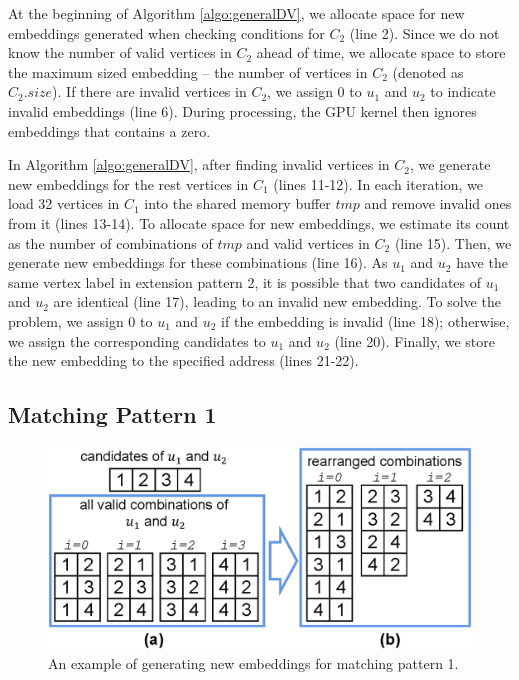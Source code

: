 At the beginning of Algorithm \ref{algo:generalDV}, we allocate space for new embeddings generated when checking
conditions for $C_2$ (line 2). Since we do not know the number of valid vertices in $C_2$ ahead of time, we allocate
space to store the maximum sized embedding – the number of vertices in  $C_2$ (denoted as $C_{2}.size$). If there are
invalid vertices in $C_2$, we assign 0 to $u_1$ and $u_2$ to indicate invalid embeddings (line 6). During processing,
the GPU kernel then ignores embeddings that contains a zero.


In Algorithm \ref{algo:generalDV}, after finding invalid vertices in $C_2$, we generate new embeddings for the rest
vertices in $C_1$ (lines 11-12). In each iteration, we load 32 vertices in $C_1$ into the shared memory buffer $tmp$
and remove invalid ones from it (lines 13-14). To allocate space for new embeddings, we estimate its count as the
number of combinations of $tmp$ and valid vertices in $C_2$ (line 15). Then, we generate new embeddings for these
combinations (line 16). As $u_1$ and $u_2$ have the same vertex label in extension pattern 2, it is possible that two
candidates of $u_1$ and $u_2$ are identical (line 17),  leading to an invalid new embedding. To solve the problem, we
assign 0 to $u_1$ and $u_2$ if the embedding is invalid (line 18); otherwise, we assign the corresponding candidates to
$u_1$ and $u_2$ (line 20). Finally, we store the new embedding to the specified address (lines 21-22).


\subsection{Matching Pattern 1}
\begin{figure} [t]
\centering
\includegraphics[width=\columnwidth]{./figure/ep1opt.eps}
\caption{An example of generating new embeddings for matching pattern 1.}	
\label{fig:ep1opt}
\end{figure}


